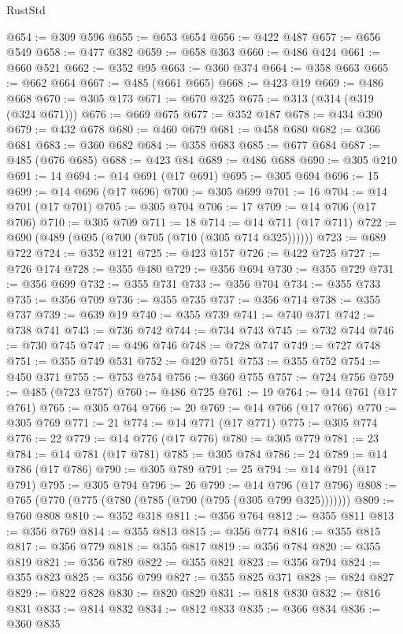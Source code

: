 \begin{lexlean}{RustStd}
\begin{coremodule}
@654 := @309 @596
@655 := @653 @654
@656 := @422 @487
@657 := @656 @549
@658 := @477 @382
@659 := @658 @363
@660 := @486 @424
@661 := @660 @521
@662 := @352 @95
@663 := @360 @374
@664 := @358 @663
@665 := @662 @664
@667 := @485 (@661 @665)
@668 := @423 @19
@669 := @486 @668
@670 := @305 @173
@671 := @670 @325
@675 := @313 (@314 (@319 (@324 @671)))
@676 := @669 @675
@677 := @352 @187
@678 := @434 @390
@679 := @432 @678
@680 := @460 @679
@681 := @458 @680
@682 := @366 @681
@683 := @360 @682
@684 := @358 @683
@685 := @677 @684
@687 := @485 (@676 @685)
@688 := @423 @84
@689 := @486 @688
@690 := @305 @210
@691 := 14
@694 := @14 @691 (@17 @691)
@695 := @305 @694
@696 := 15
@699 := @14 @696 (@17 @696)
@700 := @305 @699
@701 := 16
@704 := @14 @701 (@17 @701)
@705 := @305 @704
@706 := 17
@709 := @14 @706 (@17 @706)
@710 := @305 @709
@711 := 18
@714 := @14 @711 (@17 @711)
@722 := @690 (@489 (@695 (@700 (@705 (@710 (@305 @714 @325))))))
@723 := @689 @722
@724 := @352 @121
@725 := @423 @157
@726 := @422 @725
@727 := @726 @174
@728 := @355 @480
@729 := @356 @694
@730 := @355 @729
@731 := @356 @699
@732 := @355 @731
@733 := @356 @704
@734 := @355 @733
@735 := @356 @709
@736 := @355 @735
@737 := @356 @714
@738 := @355 @737
@739 := @639 @19
@740 := @355 @739
@741 := @740 @371
@742 := @738 @741
@743 := @736 @742
@744 := @734 @743
@745 := @732 @744
@746 := @730 @745
@747 := @496 @746
@748 := @728 @747
@749 := @727 @748
@751 := @355 @749 @531
@752 := @429 @751
@753 := @355 @752
@754 := @450 @371
@755 := @753 @754
@756 := @360 @755
@757 := @724 @756
@759 := @485 (@723 @757)
@760 := @486 @725
@761 := 19
@764 := @14 @761 (@17 @761)
@765 := @305 @764
@766 := 20
@769 := @14 @766 (@17 @766)
@770 := @305 @769
@771 := 21
@774 := @14 @771 (@17 @771)
@775 := @305 @774
@776 := 22
@779 := @14 @776 (@17 @776)
@780 := @305 @779
@781 := 23
@784 := @14 @781 (@17 @781)
@785 := @305 @784
@786 := 24
@789 := @14 @786 (@17 @786)
@790 := @305 @789
@791 := 25
@794 := @14 @791 (@17 @791)
@795 := @305 @794
@796 := 26
@799 := @14 @796 (@17 @796)
@808 := @765 (@770 (@775 (@780 (@785 (@790 (@795 (@305 @799 @325)))))))
@809 := @760 @808
@810 := @352 @318
@811 := @356 @764
@812 := @355 @811
@813 := @356 @769
@814 := @355 @813
@815 := @356 @774
@816 := @355 @815
@817 := @356 @779
@818 := @355 @817
@819 := @356 @784
@820 := @355 @819
@821 := @356 @789
@822 := @355 @821
@823 := @356 @794
@824 := @355 @823
@825 := @356 @799
@827 := @355 @825 @371
@828 := @824 @827
@829 := @822 @828
@830 := @820 @829
@831 := @818 @830
@832 := @816 @831
@833 := @814 @832
@834 := @812 @833
@835 := @366 @834
@836 := @360 @835

\end{coremodule}
\end{lexlean}
